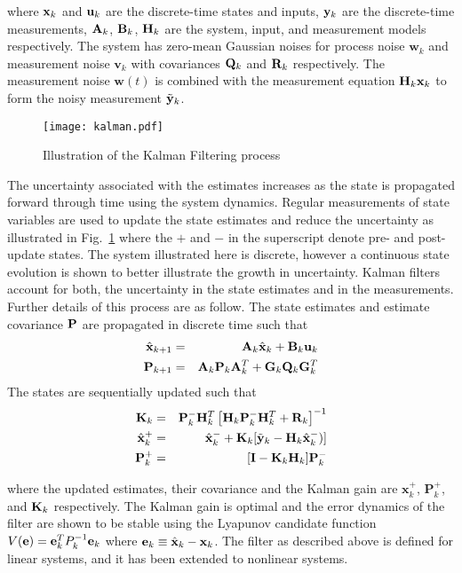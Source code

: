 \noindent where $ \x_k $ and $ \u_k $ are the discrete-time states and inputs, $ \y_k $ are the discrete-time measurements, $ \A_k $, $ \B_k $, $ \H_k $ are the system, input, and measurement models respectively. The system has zero-mean Gaussian noises for process noise $ \mathbf{w}_k $ and measurement noise $ \mathbf{v}_k $ with covariances  $ \Q_k $ and $ \R_k $ respectively. The measurement noise $ \mathbf{w}(t) $ is combined with the measurement equation $ \H_k \x_k$ to form the noisy measurement $ \tilde{\y}_k $. 

\begin{figure}
	\centering
	\texttt{[image: kalman.pdf]}
	\caption{Illustration of the Kalman Filtering process}\label{fig:kalman}
\end{figure}

The uncertainty associated with the estimates increases as the state is propagated forward through time using the system dynamics. Regular measurements of state variables are used to update the state estimates and reduce the uncertainty as illustrated in Fig.~\ref{fig:kalman} where the $ + $ and $ - $ in the superscript denote pre- and post-update states. The system illustrated here is discrete, however a continuous state evolution is shown to better illustrate the growth in uncertainty. Kalman filters account for both, the uncertainty in the state estimates and in the measurements. Further details of this process are as follow. The state estimates and estimate covariance $ \P $ are propagated in discrete time such that
\begin{eqnarray}
	\hat{\x}_{k+1} &=& \A_k \hat{\x}_k + \B_k \u_k \\
	\P_{k+1} &=& \A_k\P_k \A_k^T + \mathbf{G}_k\Q_k\mathbf{G}_k^T 
\end{eqnarray}
\noindent The states are sequentially updated such that
\begin{eqnarray}
	\K_k &=& \P_k^- \H^T_k \left[\H_k \P_k^- \H^T_k + \R_k\right]^{-1} \\
	\hat{\x}_k^+ &=& \hat{\x}_k^- + \K_k[\tilde{\y}_k- \H_k \hat{\x}_k^-)] \\
	\P_k^+ &=& [\mathbf{I} - \K_k \H_k]\P_k^-
\end{eqnarray}

\noindent where the updated estimates, their covariance and the Kalman gain are $ \mathbf{x}_k^+ $, $ \mathbf{P}_k^+ $, and $ \K_k $ respectively. The Kalman gain is optimal and the error dynamics of the filter are shown to be stable \cite{Crassidis} using the Lyapunov candidate function $ V(\e) = \e_k^T P_k^{-1} \e_k $ where $ \e_k \equiv \hat{\x}_k - \x_k $. The filter as described above is defined for linear systems, and it has been extended to nonlinear systems.

